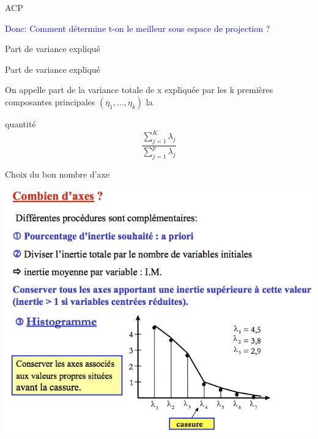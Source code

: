 \documentclass[11pt]{beamer}
\begin{document}



\begin{frame}{ACP }


\begin{Large}
\textcolor{blue}{Donc: Comment détermine t-on le meilleur sous espace de projection ?}
\end{Large}

\end{frame}





\begin{frame}{Part de variance expliqué }

 \begin{block}{Part de variance expliqué}
 
 On appelle part de la variance totale de x expliquée par les k
premières composantes principales $(\eta_1, \ldots, \eta_k)$ la 

quantité  $$ \frac{\sum_{j=1}^K\lambda_j}{\sum_{j=1}^p\lambda_j} $$ 
 
 \end{block}

\end{frame}


\begin{frame}{ Choix du bon nombre d'axe}


 \includegraphics[scale=0.4]{Kaiser.png}

\end{frame}
\end{document}
